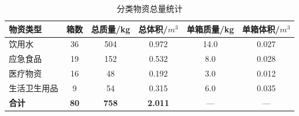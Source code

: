 \begin{table}[htbp]
\caption{分类物资总量统计}
\label{tab:box_type}
\centering
{}
\setlength{\tabcolsep}{4pt}
\begin{tabular}{lccccc}
\toprule
物资类型 & 箱数 & 总质量/kg & 总体积/$m^{3}$ & 单箱质量/kg & 单箱体积/$m^{3}$ \\
\midrule
饮用水 & 36 & 504 & 0.972 & 14.0 & 0.027 \\
应急食品 & 19 & 152 & 0.532 & 8.0 & 0.028 \\
医疗物资 & 16 & 48 & 0.192 & 3.0 & 0.012 \\
生活卫生用品 & 9 & 54 & 0.315 & 6.0 & 0.035 \\
\textbf{合计} & \textbf{80} & \textbf{758} & \textbf{2.011} & — & — \\
\bottomrule
\end{tabular}
\end{table}
